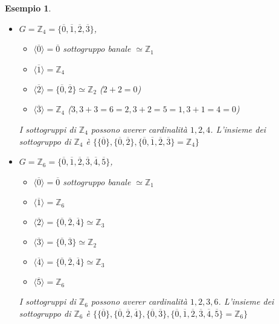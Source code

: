 \documentclass[a4paper,12pt]{article}
\theoremstyle{def}
\theoremstyle{prop}
\theoremstyle{esempio}
\newtheorem*{example}{Esempio}
\theoremstyle{dimostrazione}
\theoremstyle{teo}
\theoremstyle{osservazione}
\begin{document}
\begin{example}
    \
    \begin{itemize}
        \item \(G = \mathbb{Z}_4 = \{\overline{0}, \overline{1}, \overline{2}, \overline{3}\}\), \
              \begin{itemize}
                  \item \(\langle \overline{0} \rangle = {\overline{0}}\) sottogruppo banale \(\simeq \mathbb{Z}_1\)
                  \item \(\langle \overline{1} \rangle = \mathbb{Z}_4\)
                  \item \(\langle \overline{2} \rangle = \{\overline{0}, \overline{2}\} \simeq \mathbb{Z}_2\) (\(2+2=0\))
                  \item \(\langle \overline{3} \rangle = \mathbb{Z}_4\) (\(3 , 3+3=6=2, 3+2=5=1, 3+1=4=0\))
              \end{itemize}
              I sottogruppi di \(\mathbb{Z}_4\) possono averer cardinalità \(1,2,4\). L'insieme
              dei sottogruppo di \(\mathbb{Z}_4\) è \(\{\{\overline{0}\}, \{\overline{0}, \overline{2}\},
              \{\overline{0}, \overline{1}, \overline{2}, \overline{3}\}= \mathbb{Z}_4\}\)
        \item \(G = \mathbb{Z}_6 = \{\overline{0}, \overline{1}, \overline{2}, \overline{3}, \overline{4}, \overline{5}\}\), \
              \begin{itemize}
                  \item \(\langle \overline{0} \rangle = {\overline{0}}\) sottogruppo banale \(\simeq \mathbb{Z}_1\)
                  \item \(\langle \overline{1} \rangle = \mathbb{Z}_6\)
                  \item \(\langle \overline{2} \rangle = \{\overline{0}, \overline{2}, \overline{4}\} \simeq \mathbb{Z}_3\)
                  \item \(\langle \overline{3} \rangle = \{\overline{0}, \overline{3}\} \simeq \mathbb{Z}_2\)
                  \item \(\langle \overline{4} \rangle = \{\overline{0}, \overline{2}, \overline{4}\} \simeq \mathbb{Z}_3\)
                  \item \(\langle \overline{5} \rangle = \mathbb{Z}_6\)
              \end{itemize}
              I sottogruppi di \(\mathbb{Z}_6\) possono averer cardinalità \(1,2,3,6\). L'insieme
              dei sottogruppo di \(\mathbb{Z}_6\) è \(\{\{\overline{0}\}, \{\overline{0}, \overline{2}, \overline{4}\},
              \{\overline{0}, \overline{3}\}, \{\overline{0}, \overline{1}, \overline{2}, \overline{3}, \overline{4}, \overline{5}\}= \mathbb{Z}_6\}\)
    \end{itemize}
\end{example}
\end{document}
